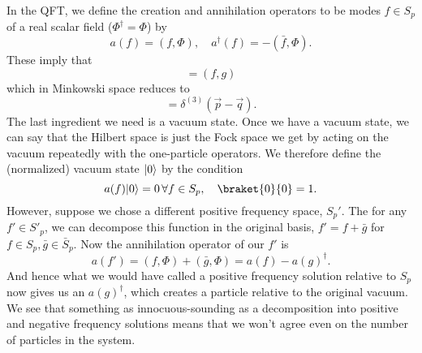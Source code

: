 In the QFT, we define the creation and annihilation operators to be modes $f\in S_p$ of a real scalar field ($\Phi^\dagger = \Phi$) by
\begin{equation}
    a(f)=(f,\Phi),\quad a^\dagger(f) =-(\bar f,\Phi).
\end{equation}
These imply that
\begin{equation}
    [a(f),a(g)^\dagger]=(f,g)
\end{equation}
which in Minkowski space reduces to
\begin{equation}
    [a_{\vec p},a^\dagger_{\vec q}]=\delta^{(3)}(\vec p- \vec q).
\end{equation}
The last ingredient we need is a vacuum state. Once we have a vacuum state, we can say that the Hilbert space is just the Fock space we get by acting on the vacuum repeatedly with the one-particle operators. We therefore define the (normalized) vacuum state $\lvert0\rangle$ by the condition
\begin{equation}
    a(f)\ket{0} = 0\, \forall f\in S_p, \quad \braket{0}{0}=1.
\end{equation}
However, suppose we chose a different positive frequency space, $S_p'$. The for any $f'\in S'_p$, we can decompose this function in the original basis, $f'=f+\bar g$ for $f\in S_p,\bar g\in \bar S_p$. Now the annihilation operator of our $f'$ is
\begin{equation}
    a(f') = (f,\Phi) +(\bar g,\Phi)=a(f) -a(g)^\dagger.
\end{equation}
And hence what we would have called a positive frequency solution relative to $S_p$ now gives us an $a(g)^\dagger$, which creates a particle relative to the original vacuum. We see that something as innocuous-sounding as a decomposition into positive and negative frequency solutions means that we won't agree even on the number of particles in the system.